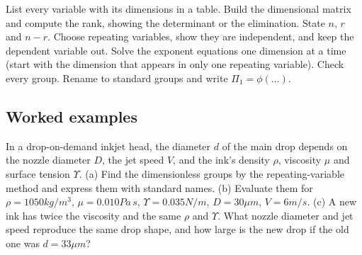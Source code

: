 \begin{firstmoves}
List every variable with its dimensions in a table. Build the dimensional matrix and compute the rank, showing the determinant or the elimination. State $n$, $r$ and $n - r$. Choose repeating variables, show they are independent, and keep the dependent variable out. Solve the exponent equations one dimension at a time (start with the dimension that appears in only one repeating variable). Check every group. Rename to standard groups and write $\Pi_1 = \phi(\dots)$.
\end{firstmoves}

\subsection*{Worked examples}

\begin{example}
In a drop-on-demand inkjet head, the diameter $d$ of the main drop depends on the nozzle diameter $D$, the jet speed $V$, and the ink's density $\rho$, viscosity $\mu$ and surface tension $\Upsilon$.
(a) Find the dimensionless groups by the repeating-variable method and express them with standard names.
(b) Evaluate them for $\rho = 1050\unit{kg/m^3}$, $\mu = 0.010\unit{Pa\,s}$, $\Upsilon = 0.035\unit{N/m}$, $D = 30\unit{\mu m}$, $V = 6\unit{m/s}$.
(c) A new ink has twice the viscosity and the same $\rho$ and $\Upsilon$. What nozzle diameter and jet speed reproduce the same drop shape, and how large is the new drop if the old one was $d = 33\unit{\mu m}$?
\end{example}

